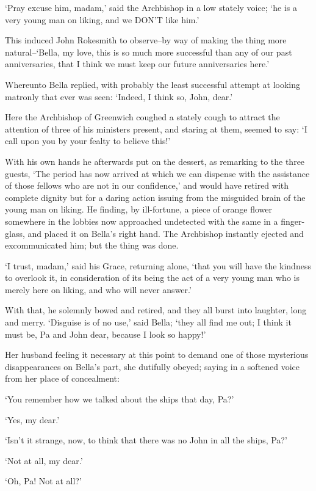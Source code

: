 ‘Pray excuse him, madam,’ said the Archbishop in a low stately voice;
‘he is a very young man on liking, and we DON’T like him.’

This induced John Rokesmith to observe--by way of making the thing more
natural--‘Bella, my love, this is so much more successful than any
of our past anniversaries, that I think we must keep our future
anniversaries here.’

Whereunto Bella replied, with probably the least successful attempt at
looking matronly that ever was seen: ‘Indeed, I think so, John, dear.’

Here the Archbishop of Greenwich coughed a stately cough to attract the
attention of three of his ministers present, and staring at them, seemed
to say: ‘I call upon you by your fealty to believe this!’

With his own hands he afterwards put on the dessert, as remarking to the
three guests, ‘The period has now arrived at which we can dispense with
the assistance of those fellows who are not in our confidence,’ and
would have retired with complete dignity but for a daring action issuing
from the misguided brain of the young man on liking. He finding, by
ill-fortune, a piece of orange flower somewhere in the lobbies now
approached undetected with the same in a finger-glass, and placed it on
Bella’s right hand. The Archbishop instantly ejected and excommunicated
him; but the thing was done.

‘I trust, madam,’ said his Grace, returning alone, ‘that you will have
the kindness to overlook it, in consideration of its being the act of a
very young man who is merely here on liking, and who will never answer.’

With that, he solemnly bowed and retired, and they all burst into
laughter, long and merry. ‘Disguise is of no use,’ said Bella; ‘they
all find me out; I think it must be, Pa and John dear, because I look so
happy!’

Her husband feeling it necessary at this point to demand one of those
mysterious disappearances on Bella’s part, she dutifully obeyed; saying
in a softened voice from her place of concealment:

‘You remember how we talked about the ships that day, Pa?’

‘Yes, my dear.’

‘Isn’t it strange, now, to think that there was no John in all the
ships, Pa?’

‘Not at all, my dear.’

‘Oh, Pa! Not at all?’

